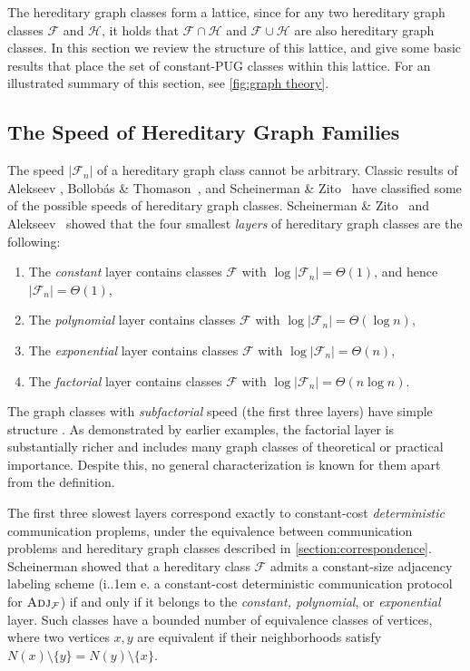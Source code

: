 \documentclass{article}
\makeatletter
\newcommand{\cF}{\ensuremath{\mathcal{F}}}
\newcommand{\cH}{\ensuremath{\mathcal{H}}}
\newcommand{\Adj}{\textsc{Adj}}
\newcommand*\ie{i.\kern.1em e.\@\xspace} %
\makeatother
\begin{document}
The hereditary graph classes form a lattice, since for any two hereditary graph classes $\cF$ and $\cH$,
it holds that $\cF \cap \cH$ and $\cF \cup \cH$ are also hereditary graph classes.  In this section we
review the structure of this lattice, and give some basic results that place the set of constant-PUG
classes within this lattice.  For an illustrated summary of this section, see \cref{fig:graph
theory}.

\subsection{The Speed of Hereditary Graph Families}
\label{section:appendix-speed}

The speed $|\cF_n|$ of a hereditary graph class cannot be arbitrary. Classic results of Alekseev
\cite{Ale92,Ale97}, Bollob{\'a}s \& Thomason~\cite{BT95}, and Scheinerman \& Zito~\cite{SZ94} have
classified some of the possible speeds of hereditary graph classes. Scheinerman \& Zito~\cite{SZ94}
and Alekseev~\cite{Ale97} showed that the four smallest \emph{layers} of hereditary graph classes
are the following:

\begin{enumerate}
	\item The \emph{constant} layer contains classes $\cF$ with $\log |\cF_n| = \Theta(1)$, and hence $|\cF_n| = \Theta(1)$,
	\item The \emph{polynomial} layer contains classes $\cF$ with $\log |\cF_n| = \Theta(\log n)$,
	\item The \emph{exponential} layer contains classes $\cF$ with $\log |\cF_n| = \Theta(n)$,
	\item The \emph{factorial} layer contains classes $\cF$ with $\log |\cF_n| = \Theta(n\log n)$.
\end{enumerate}
The graph classes with \emph{subfactorial} speed (the first three layers) have simple structure
\cite{SZ94,Ale97}. As demonstrated by earlier examples, the factorial layer is substantially richer and
includes many graph classes of theoretical or practical importance. Despite this, no general
characterization is known for them apart from the definition.

The first three slowest layers correspond exactly to constant-cost \emph{deterministic}
communication proplems, under the equivalence between communication problems and hereditary graph
classes described in \cref{section:correspondence}. Scheinerman \cite{Sch99} showed that a
hereditary class $\cF$ admits a constant-size adjacency labeling scheme (\ie a constant-cost
deterministic communication protocol for $\Adj_\cF$) if and only if it belongs to the
\emph{constant, polynomial}, or \emph{exponential} layer.  Such classes have a bounded number of
equivalence classes of vertices, where two vertices $x,y$ are equivalent if their neighborhoods
satisfy $N(x) \setminus \{y\} = N(y) \setminus \{x\}$.  
\end{document}
